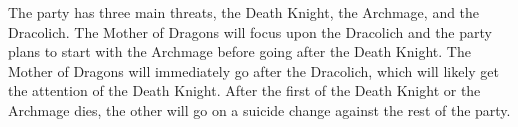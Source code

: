 The party has three main threats, the Death Knight, the Archmage, and the Dracolich.
The Mother of Dragons will focus upon the Dracolich and the party plans to start with the Archmage before going after the Death Knight.
The Mother of Dragons will immediately go after the Dracolich, which will likely get the attention of the Death Knight.
After the first of the Death Knight or the Archmage dies, the other will go on a suicide change against the rest of the party.
